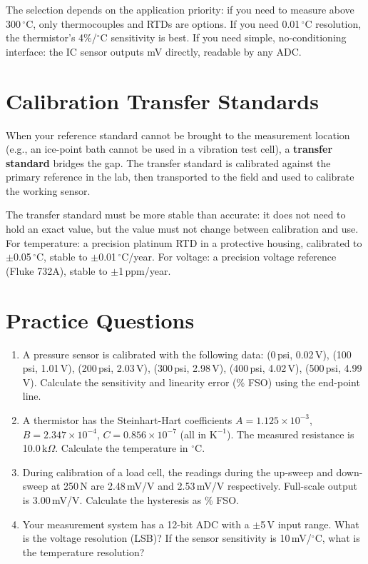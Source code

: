 \documentclass[11pt,letterpaper,twoside,openany]{book}
\newcommand{\degC}{\ensuremath{{}^{\circ}\text{C}}}
\begin{document}
The selection depends on the application priority: if you need to measure above 300\,\degC{}, only thermocouples and RTDs are options. If you need 0.01\,\degC{} resolution, the thermistor's 4\%/\degC{} sensitivity is best. If you need simple, no-conditioning interface: the IC sensor outputs mV directly, readable by any ADC.

\section{Calibration Transfer Standards}
When your reference standard cannot be brought to the measurement location (e.g., an ice-point bath cannot be used in a vibration test cell), a \textbf{transfer standard} bridges the gap. The transfer standard is calibrated against the primary reference in the lab, then transported to the field and used to calibrate the working sensor.

The transfer standard must be more stable than accurate: it does not need to hold an exact value, but the value must not change between calibration and use. For temperature: a precision platinum RTD in a protective housing, calibrated to $\pm$0.05\,\degC{}, stable to $\pm$0.01\,\degC{}/year. For voltage: a precision voltage reference (Fluke 732A), stable to $\pm$1\,ppm/year.
\section{Practice Questions}
\begin{enumerate}[leftmargin=1.5em]
\item A pressure sensor is calibrated with the following data: (0\,psi, 0.02\,V), (100\,psi, 1.01\,V), (200\,psi, 2.03\,V), (300\,psi, 2.98\,V), (400\,psi, 4.02\,V), (500\,psi, 4.99\,V). Calculate the sensitivity and linearity error (\% FSO) using the end-point line.
\item A thermistor has the Steinhart-Hart coefficients $A = 1.125 \times 10^{-3}$, $B = 2.347 \times 10^{-4}$, $C = 0.856 \times 10^{-7}$ (all in $\text{K}^{-1}$). The measured resistance is 10.0\,k$\Omega$. Calculate the temperature in \degC{}.
\item During calibration of a load cell, the readings during the up-sweep and down-sweep at 250\,N are 2.48\,mV/V and 2.53\,mV/V respectively. Full-scale output is 3.00\,mV/V. Calculate the hysteresis as \% FSO.
\item Your measurement system has a 12-bit ADC with a $\pm$5\,V input range. What is the voltage resolution (LSB)? If the sensor sensitivity is 10\,mV/\degC{}, what is the temperature resolution?
\end{enumerate}
\end{document}
